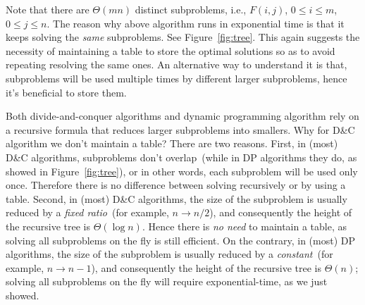 Note that there are $\Theta(mn)$ distinct subproblems, i.e., $F(i,j)$, $0\le i
\le m$, $0\le j \le n$. The reason why above
algorithm runs in exponential time is that it keeps solving the \emph{same}
subproblems. See Figure~\ref{fig:tree}. This again suggests the necessity
of maintaining a table to store the optimal solutions so as to avoid
repeating resolving the same ones.
An alternative way to understand it is that, subproblems will be used
multiple times by different larger subproblems, hence it's beneficial
to store them.


Both divide-and-conquer algorithms and dynamic programming algorithm
rely on a recursive formula that reduces larger subproblems into smallers.
Why for D\&C algorithm we don't maintain a table?
There are two reasons.
First, in (most) D\&C algorithms, subproblems don't overlap~(while in DP algorithms they do, as showed in Figure~\ref{fig:tree}), or in other words,
each subproblem will be used only once. Therefore there is no difference between
solving recursively or by using a table.
Second, in (most) D\&C algorithms, the size of the subproblem is usually reduced by a \emph{fixed ratio}~(for example, $n\to n/2$),
and consequently the height of the recursive tree is $\Theta(\log n)$. 
Hence there is \emph{no need} to maintain a table, as solving all subproblems on the fly is still efficient.
On the contrary, in (most) DP algorithms, the size of the subproblem is usually reduced by a \emph{constant}~(for example, $n\to n-1$),
and consequently the height of the recursive tree is $\Theta(n)$;
solving all subproblems on the fly will require exponential-time, as we just showed.

